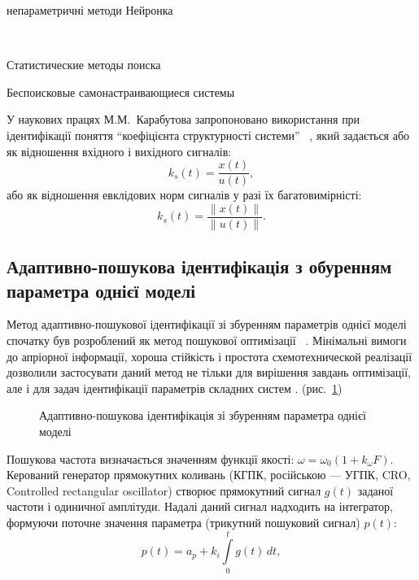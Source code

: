 непараметричні методи
Нейронка~\cite{chen_nn_for_nls_mod,chen_nls_id_radial_basis,patra_nds_id_cheb,narendra_id_ctl_ds_nn,bodyan_adapt_viyavl}

~\cite{medved_nepar_alg_id_nds}


Статистические методы поиска~\cite{rastr_stat_meth_search}

Беспоисковые самонастраивающиеся системы~\cite{kozlov_nosearch_sns}


У наукових працях М.М.~Карабутова
запропоновано використання при ідентифікації
поняття ``коефіцієнта структурності системи''
~\cite{karabutov_adapt_id_sys,saliga_id_ctl_black},
який задається або як відношення
вхідного і вихідного сигналів:
%
\[
  k_s(t) = \frac{x(t)}{u(t)},
\]
%
або як відношення евклідових норм сигналів у разі їх багатовимірністі:
%
\[
  k_s(t) = \frac{\|x(t)\|}{\|u(t)\|}.
\]







\subsection{Адаптивно-пошукова ідентифікація з обуренням параметра однієї моделі}%

Метод адаптивно-пошукової ідентифікації зі збуренням параметрів
однієї моделі спочатку був розроблений як метод пошукової
оптимізації
~\cite{ivah_int_meth_direct,rastr_seu,kras_dyn_nsn,borcov}.
Мінімальні вимоги до апріорної інформації, хороша стійкість і
простота схемотехнической реалізації дозволили застосувати
даний метод не тільки для вирішення завдань оптимізації, але
і для задач ідентифікації параметрів складних систем
\cite{mich_92,mai_adopt_meth_direct,mai_iss_adop_alg_etalon}.
(рис.~\ref{atu:f:apid1})

\begin{figure}[htb!]
\begin{center}

\end{center}
\caption{Адаптивно-пошукова ідентифікація зі збуренням параметра однієї моделі}
\label{atu:f:apid1}
\end{figure}

Пошукова частота визначається значенням функції якості:
\( \omega = \omega_0 ( 1 + k_\omega F ) \).
Керований генератор прямокутних коливань
(КГПК, російською --- УГПК, CRO, Controlled rectangular oscillator)
створює прямокутний сигнал $g(t)$ заданої частоти і одиничної
амплітуди. Надалі даний сигнал надходить на інтегратор, формуючи
поточне значення параметра (трикутний пошуковий сигнал) $p(t)$:
%
\begin{equation}
 p(t) = a_p + k_i \int\limits_{0}^{t} g(t) \, dt ,
\label{atu:eq:api_integr}
\end{equation}

